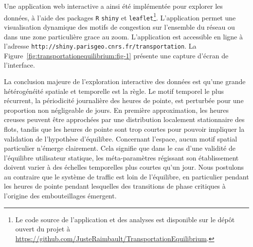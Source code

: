 {Une application web interactive a ainsi été implémentée pour explorer les données, à l'aide des packages \texttt{R} \texttt{shiny} et \texttt{leaflet}\footnote{Le code source de l'application et des analyses est disponible sur le dépôt ouvert du projet à \url{https://github.com/JusteRaimbault/TransportationEquilibrium}.}. L'application permet une visualisation dynamique des motifs de congestion sur l'ensemble du réseau ou dans une zone particulière grace au zoom. L'application est accessible en ligne à l'adresse \texttt{http://shiny.parisgeo.cnrs.fr/transportation}. La Figure~\ref{fig:transportationequilibrium:fig-1} présente une capture d'écran de l'interface.

La conclusion majeure de l'exploration interactive des données est qu'une grande hétérogénéité spatiale et temporelle est la règle. Le motif temporel le plus récurrent, la périodicité journalière des heures de pointe, est perturbée pour une proportion non négligeable de jours. En première approximation, les heures creuses peuvent être approchées par une distribution localement stationnaire des flots, tandis que les heures de pointe sont trop courtes pour pouvoir impliquer la validation de l'hypothèse d'équilibre. Concernant l'espace, aucun motif spatial particulier n'émerge clairement. Cela signifie que dans le cas d'une validité de l'équilibre utilisateur statique, les méta-paramètres régissant son établissement doivent varier à des échelles temporelles plus courtes qu'un jour. Nous postulons au contraire que le système de traffic est loin de l'équilibre, en particulier pendant les heures de pointe pendant lesquelles des transitions de phase critiques à l'origine des embouteillages émergent.
}
 


